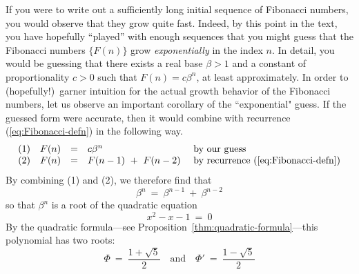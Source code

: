 \bigskip

\noindent {}

\bigskip 

If you were to write out a sufficiently long initial sequence of Fibonacci numbers, you would observe that they grow quite fast.  Indeed, by this point in the text, you have hopefully ``played'' with enough sequences that you might guess that the Fibonacci numbers $\{ F(n) \}$ grow {\em exponentially} in the index $n$.  In detail, you would be guessing that there exists a real base $\beta > 1$ and a constant of proportionality $c > 0$ such that $F(n) = c \beta^n$, at least approximately.  In order to (hopefully!)~garner intuition for the actual growth behavior of the Fibonacci numbers, let us observe an important corollary of the ``exponential" guess.  If the guessed form were accurate, then it would combine with recurrence (\ref{eq:Fibonacci-defn}) in the following way.
\[ \begin{array}{cccll}
(1) & F(n) & = & c \beta^n
      & \mbox{ by our guess} \\
(2) & F(n) & = & F(n-1) \ + \ F(n-2)
      & \mbox{ by recurrence (\ref{eq:Fibonacci-defn})}
\end{array}
\]
By combining (1) and (2), we therefore find that
\[ \beta^n \ = \ \beta^{n-1} \ + \ \beta^{n-2} \]
so that $\beta^n$ is a root of the quadratic equation
\[
x^2 - x - 1 \ = \ 0
\]
By the quadratic formula---see Proposition~\ref{thm:quadratic-formula}---this polynomial has two roots: 
\[ \Phi \ = \ {\displaystyle \frac{1+\sqrt{5}}{2}} \ \ \ \mbox{ and } \ \ \
\Phi' \ = \ {\displaystyle \frac{1-\sqrt{5}}{2}} \]


